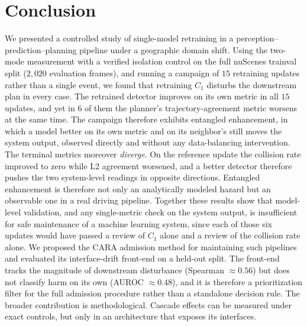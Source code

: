\documentclass[conference]{IEEEtran}
\begin{document}
\section{Conclusion}
\label{sec:conclusion}
We presented a controlled study of single-model retraining in a
perception--prediction--planning pipeline under a geographic domain shift. Using
the two-mode measurement with a verified isolation control on the full nuScenes
trainval split ($2{,}020$ evaluation frames), and running a campaign of $15$
retraining updates rather than a single event, we found that retraining $C_1$
disturbs the downstream plan in every case. The retrained detector improves on
its own metric in all $15$ updates, and yet in $6$ of them the planner's
trajectory-agreement metric worsens at the same time. The campaign therefore
exhibits entangled enhancement, in which a model better on its own metric and on
its neighbor's still moves the system output, observed directly and without any
data-balancing intervention. The terminal metrics moreover \emph{diverge}. On
the reference update the collision rate improved to zero while L2 agreement
worsened, and a better detector therefore pushes the two system-level readings in opposite
directions. Entangled enhancement is therefore not only an analytically modeled
hazard but an observable one in a real driving pipeline. Together these results
show that model-level validation, and any single-metric check on the system
output, is insufficient for safe maintenance of a machine learning system, since each of those six updates
would have passed a review of $C_1$ alone and a review of the collision rate alone. We proposed the CARA admission method for
maintaining such pipelines and evaluated its interface-drift front-end on a
held-out split. The front-end tracks the magnitude of downstream disturbance
(Spearman $\approx 0.56$) but does not classify harm on its own (AUROC $\approx
0.48$), and it is therefore a prioritization filter for the full admission
procedure rather than a standalone decision rule. The broader contribution is
methodological. Cascade effects can be measured under exact controls, but only in
an architecture that exposes its interfaces.



\end{document}
